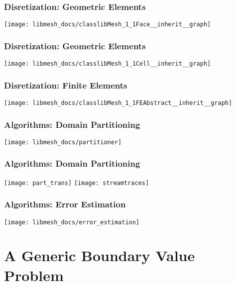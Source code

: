 \frame
{
  \frametitle{Disretization: Geometric Elements}
  \begin{center}
    \texttt{[image: libmesh\_docs/classlibMesh\_1\_1Face\_\_inherit\_\_graph]}
  \end{center}
}      



\frame
{
  \frametitle{Disretization: Geometric Elements}
  \begin{center}
    \texttt{[image: libmesh\_docs/classlibMesh\_1\_1Cell\_\_inherit\_\_graph]}
  \end{center}
}      



\frame
{
  \frametitle{Disretization: Finite Elements}
  \begin{center}
    \texttt{[image: libmesh\_docs/classlibMesh\_1\_1FEAbstract\_\_inherit\_\_graph]}
  \end{center}
}      



\frame
{
  \frametitle{Algorithms: Domain Partitioning}
  \begin{center}
    \texttt{[image: libmesh\_docs/partitioner]}
  \end{center}
}



\frame
{
  \frametitle{Algorithms: Domain Partitioning}
  \begin{center}
    \texttt{[image: part\_trans]}
    \texttt{[image: streamtraces]}
  \end{center}  
}


\frame
{
  \frametitle{Algorithms: Error Estimation}
  \begin{center}
    \texttt{[image: libmesh\_docs/error\_estimation]}
  \end{center}
}


\section{A Generic Boundary Value Problem}





